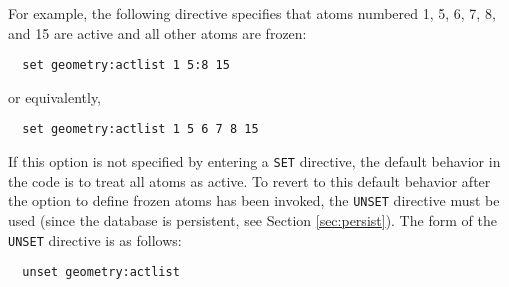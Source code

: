 For example, the following directive specifies that atoms numbered 1,
5, 6, 7, 8, and 15 are active and all other atoms are frozen:
\begin{verbatim}
  set geometry:actlist 1 5:8 15
\end{verbatim}
or equivalently,
\begin{verbatim}
  set geometry:actlist 1 5 6 7 8 15
\end{verbatim}

If this option is not specified by entering a \verb+SET+ directive,
the default behavior in the code is to treat all atoms as active.  To
revert to this default behavior after the option to define frozen
atoms has been invoked, the \verb+UNSET+ directive must be used (since
the database is persistent, see Section \ref{sec:persist}).  The form
of the \verb+UNSET+ directive is as follows:
\begin{verbatim}
  unset geometry:actlist
\end{verbatim}




